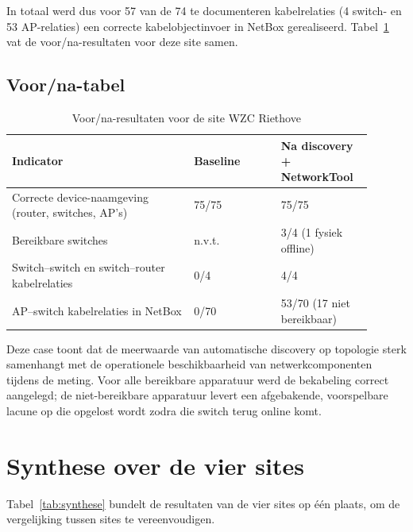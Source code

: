 In totaal werd dus voor 57 van de 74 te documenteren kabelrelaties (4 switch- en 53 AP-relaties) een correcte kabelobjectinvoer in NetBox gerealiseerd. Tabel~\ref{tab:wzc-voor-na} vat de voor/na-resultaten voor deze site samen.

\subsection{Voor/na-tabel}

\begin{table}[H]
  \centering
  \caption[Voor/na-resultaten WZC Riethove]{Voor/na-resultaten voor de site WZC Riethove}
  \label{tab:wzc-voor-na}
  \begin{tabular}{p{0.46\linewidth} p{0.22\linewidth} p{0.22\linewidth}}
    \toprule
    \textbf{Indicator} & \textbf{Baseline} & \textbf{Na discovery + NetworkTool} \\
    \midrule
    Correcte device-naamgeving (router, switches, AP's) & 75/75 & 75/75 \\
    Bereikbare switches & n.v.t. & 3/4 (1 fysiek offline) \\
    Switch--switch en switch--router kabelrelaties & 0/4 & 4/4 \\
    AP--switch kabelrelaties in NetBox & 0/70 & 53/70 (17 niet bereikbaar) \\
    \bottomrule
  \end{tabular}
\end{table}

Deze case toont dat de meerwaarde van automatische discovery op topologie sterk samenhangt met de operationele beschikbaarheid van netwerkcomponenten tijdens de meting. Voor alle bereikbare apparatuur werd de bekabeling correct aangelegd; de niet-bereikbare apparatuur levert een afgebakende, voorspelbare lacune op die opgelost wordt zodra die switch terug online komt.

\section{Synthese over de vier sites}
\label{sec:synthese-casestudy}

Tabel~\ref{tab:synthese} bundelt de resultaten van de vier sites op één plaats, om de vergelijking tussen sites te vereenvoudigen.

